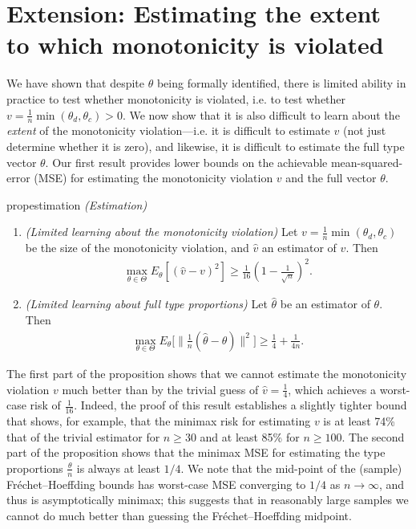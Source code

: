 \documentclass[12pt,reqno]{amsart}
\begin{document}
\section{Extension: Estimating the extent to which monotonicity is violated}

We have shown that despite $\theta$ being formally identified, there is limited ability in practice to test whether monotonicity is violated, i.e. to test whether $v = \frac{1}{n} \min(\theta_d,\theta_c) > 0$. We now show that it is also difficult to learn about the \emph{extent} of the monotonicity violation---i.e. it is difficult to estimate $v$ (not just determine whether it is zero), and likewise, it is difficult to estimate the full type vector $\theta$. Our first result provides lower bounds on the achievable mean-squared-error (MSE) for estimating the monotonicity violation $v$ and the full vector $\theta$.



\begin{restatable}{prop}{estimation}
\label{prop:estimation}
\emph{(Estimation)}
\begin{enumerate}
    \item \emph{(Limited learning about the monotonicity violation)}
        Let $v = \tfrac{1}{n} \min(\theta_d,\theta_c)$ be the size of the monotonicity violation, and $\hat{v}$ an estimator of $v$. Then
        \begin{align*}
            \max_{\theta \in \Theta} E_\theta [ (\hat{v} - v )^2] \geq \frac{1}{16}  \left(1 - \frac{1}{\sqrt{n}}\right)^2.
        \end{align*}

    \item \emph{(Limited learning about full type proportions)}
        Let $\hat{\theta}$ be an estimator of $\theta$.
        Then
        \begin{align*}
            \max_{\theta \in \Theta} E_\theta\bigg[ \big\| \tfrac{1}{n} (\hat{\theta} - \theta) \big\|^2 \bigg] \geq  \frac{1}{4} + \frac{1}{4 n}.
        \end{align*}
    \end{enumerate}
\end{restatable}

The first part of the proposition shows that we cannot estimate the monotonicity violation $v$ much better than by the trivial guess of $\hat{v} = \tfrac{1}{4}$, which achieves a worst-case risk of $\tfrac{1}{16}$. Indeed, the proof of this result establishes a slightly tighter bound that shows, for example, that the minimax risk for estimating $v$ is at least 74\% that of the trivial estimator for $n \geq 30$ and at least 85\% for $n \geq 100$. The second part of the proposition shows that the minimax MSE for estimating the type proportions $\frac{\theta}{n}$ is always at least $1/4$. We note that the mid-point of the (sample) Fr\'echet--Hoeffding bounds has worst-case MSE converging to $1/4$ as $n \to \infty$, and thus is asymptotically minimax; this suggests that in reasonably large samples we cannot do much better than guessing the Fr\'echet--Hoeffding midpoint. 
\end{document}
